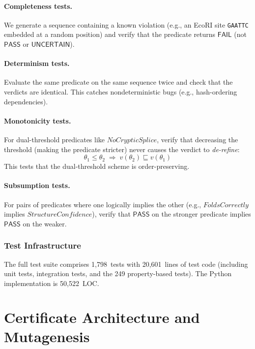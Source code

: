 \documentclass[sigplan,10pt,manuscript,review,anonymous]{acmart}
\newcommand{\PASS}{\ensuremath{\mathsf{PASS}}\xspace}
\newcommand{\FAIL}{\ensuremath{\mathsf{FAIL}}\xspace}
\newcommand{\UNCERTAIN}{\ensuremath{\mathsf{UNCERTAIN}}\xspace}
\newcommand{\verdict}{v}
\begin{document}
\paragraph{Completeness tests.}
We generate a sequence containing a known violation (e.g., an EcoRI
site \texttt{GAATTC} embedded at a random position) and verify that
the predicate returns \FAIL{} (not \PASS{} or \UNCERTAIN{}).

\paragraph{Determinism tests.}
Evaluate the same predicate on the same sequence twice and check that
the verdicts are identical.
This catches nondeterministic bugs (e.g., hash-ordering dependencies).

\paragraph{Monotonicity tests.}
For dual-threshold predicates like $\mathit{NoCrypticSplice}$, verify
that decreasing the threshold (making the predicate stricter) never
causes the verdict to \emph{de-refine}:
\[
  \theta_1 \le \theta_2 \;\Longrightarrow\;
  \verdict(\theta_2) \sqsubseteq \verdict(\theta_1)
\]
This tests that the dual-threshold scheme is order-preserving.

\paragraph{Subsumption tests.}
For pairs of predicates where one logically implies the other
(e.g., $\mathit{FoldsCorrectly}$ implies
$\mathit{StructureConfidence}$), verify that \PASS{} on the stronger
predicate implies \PASS{} on the weaker.

\subsubsection{Test Infrastructure}

The full test suite comprises 1{,}798~tests with 20{,}601~lines of
test code (including unit tests, integration tests, and the 249
property-based tests).
The Python implementation is 50{,}522~LOC.

\section{Certificate Architecture and Mutagenesis}\label{sec:cert-mut}
\end{document}
